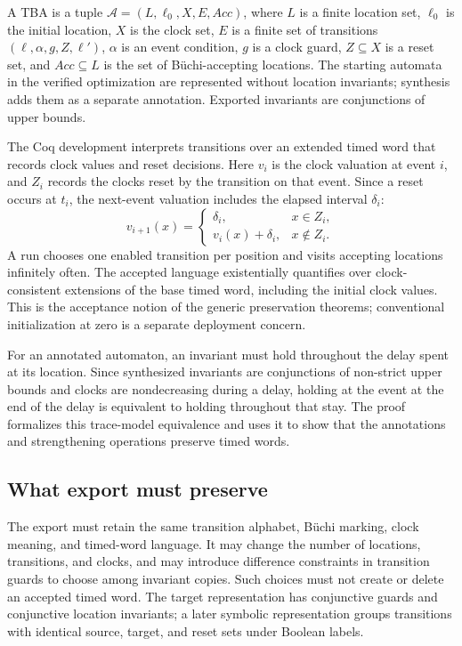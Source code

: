 \documentclass{ieeeaccess}
\begin{document}
A TBA is a tuple $\mathcal A=(L,\ell_0,X,E,\mathit{Acc})$, where $L$ is a finite location set, $\ell_0$ is the initial location, $X$ is the clock set, $E$ is a finite set of transitions $(\ell,\alpha,g,Z,\ell')$, $\alpha$ is an event condition, $g$ is a clock guard, $Z\subseteq X$ is a reset set, and $\mathit{Acc}\subseteq L$ is the set of B\"uchi-accepting locations. The starting automata in the verified optimization are represented without location invariants; synthesis adds them as a separate annotation. Exported invariants are conjunctions of upper bounds.

The Coq development interprets transitions over an extended timed word that records clock values and reset decisions. Here $v_i$ is the clock valuation at event $i$, and $Z_i$ records the clocks reset by the transition on that event. Since a reset occurs at $t_i$, the next-event valuation includes the elapsed interval $\delta_i$:
\[
v_{i+1}(x)=
\begin{cases}
\delta_i,&x\in Z_i,\\
v_i(x)+\delta_i,&x\notin Z_i.
\end{cases}
\]
A run chooses one enabled transition per position and visits accepting locations infinitely often. The accepted language existentially quantifies over clock-consistent extensions of the base timed word, including the initial clock values. This is the acceptance notion of the generic preservation theorems; conventional initialization at zero is a separate deployment concern.

For an annotated automaton, an invariant must hold throughout the delay spent at its location. Since synthesized invariants are conjunctions of non-strict upper bounds and clocks are nondecreasing during a delay, holding at the event at the end of the delay is equivalent to holding throughout that stay. The proof formalizes this trace-model equivalence and uses it to show that the annotations and strengthening operations preserve timed words.

\subsection{What export must preserve}
\label{sec:export-contract}
The export must retain the same transition alphabet, B\"uchi marking, clock meaning, and timed-word language. It may change the number of locations, transitions, and clocks, and may introduce difference constraints in transition guards to choose among invariant copies. Such choices must not create or delete an accepted timed word. The target representation has conjunctive guards and conjunctive location invariants; a later symbolic representation groups transitions with identical source, target, and reset sets under Boolean labels.
\end{document}
